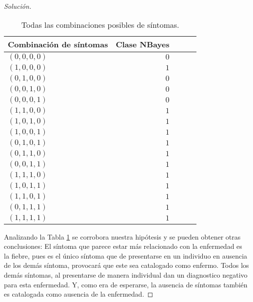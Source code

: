 \documentclass[10.5pt,notitlepage]{article}
\newenvironment{solucion}
  {\begin{proof}[Solución]}
  {\end{proof}}
\theoremstyle{plain}
\begin{document}
\begin{solucion}
\begin{table}[H]
        \centering
        \begin{tabular}{@{}l@{\hskip 0.3in}r@{\hskip 0.3in}r@{\hskip 0.3in}r@{\hskip 0.3in}r@{}}
            \toprule
            Combinación de síntomas & Clase NBayes\\ 
            \midrule
           \((0,0,0,0)\) & \(0\) \\ 
           \((1,0,0,0)\) & \(1\) \\ 
           \((0,1,0,0)\) & \(0\) \\ 
           \((0,0,1,0)\) & \(0\) \\
           \((0,0,0,1)\) & \(0\) \\ 
           \((1,1,0,0)\) & \(1\) \\ 
           \((1,0,1,0)\) & \(1\) \\ 
           \((1,0,0,1)\) & \(1\) \\
           \((0,1,0,1)\) & \(1\) \\ 
           \((0,1,1,0)\) & \(1\) \\ 
           \((0,0,1,1)\) & \(1\) \\ 
           \((1,1,1,0)\) & \(1\) \\
           \((1,0,1,1)\) & \(1\) \\ 
           \((1,1,0,1)\) & \(1\) \\ 
           \((0,1,1,1)\) & \(1\) \\ 
           \((1,1,1,1)\) & \(1\) \\           
            \bottomrule
        \end{tabular}
        \caption{Todas las combinaciones posibles de síntomas.}
        \label{tab:4}
\end{table}
Analizando la Tabla \ref{tab:4} se corrobora nuestra hipótesis y se pueden obtener otras conclusiones: El síntoma que parece estar más relacionado con la enfermedad es la fiebre, pues es el único síntoma que de presentarse en un individuo en ausencia de los demás síntoma, provocará que este sea catalogado como enfermo. Todos los demás síntomas, al presentarse de manera individual dan un diagnostico negativo para esta enfermedad. Y, como era de esperarse, la ausencia de síntomas también es catalogada como
ausencia de la enfermedad. 
\end{solucion}
\end{document}
